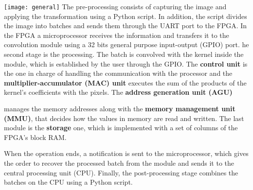 \documentclass[a1paper,portrait,fontscale=0.43]{baposter}
\begin{document}
\begin{poster}
{%


\begin{multicols}{2}
    \texttt{[image: general]}
\vfill\null
\columnbreak
The pre-processing consists of capturing the image and applying
the transformation using a Python script. In addition, the script divides the
image into batches and sends them through the UART port to the FPGA.  In the FPGA a microprocessor receives the
information and transfers it to the convolution module using a 32 bits general
purpose input-output (GPIO) port. 
he second stage is the processing. The batch is convolved with the kernel inside
the module, which is established by the user through the GPIO.
The \textbf{control unit} is the one in charge of handling the communication with
the processor and the \textbf{multiplier-accumulator (MAC) unit} executes the sum
of the products of the kernel's coefficients with the pixels. The \textbf{address generation unit (AGU)}
\end{multicols}
manages the memory addresses along with
the \textbf{memory management unit (MMU)}, that decides how the values in memory
are read and written.
The last module is the \textbf{storage} one, which is
implemented with a set of columns of the FPGA's block RAM. 

When the operation ends, a notification is sent to the microprocessor,
which gives the order to recover the processed batch from the module and sends it
to the central processing unit (CPU). Finally, the post-processing stage combines
the batches on the CPU using a Python script.
}

\end{poster}
\end{document}
